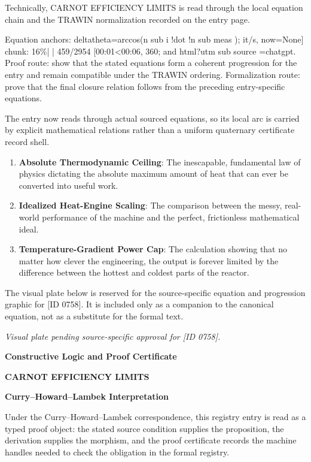 Technically, CARNOT EFFICIENCY LIMITS is read through the local equation chain and the TRAWIN normalization recorded on the entry page.

Equation anchors: deltatheta=arccos(n sub i !dot !n sub meas ); it/s, now=None] chunk: 16\%|   | 459/2954 [00:01<00:06, 360; and html?utm sub source =chatgpt. Proof route: show that the stated equations form a coherent progression for the entry and remain compatible under the TRAWIN ordering. Formalization route: prove that the final closure relation follows from the preceding entry-specific equations.

The entry now reads through actual sourced equations, so its local arc is carried by explicit mathematical relations rather than a uniform quaternary certificate record shell.
\endgroup

\begin{enumerate}[leftmargin=1.6em,itemsep=6pt,topsep=4pt]
\item \textbf{Absolute Thermodynamic Ceiling}: The inescapable, fundamental law of physics dictating the absolute maximum amount of heat that can ever be converted into useful work.
\item \textbf{Idealized Heat-Engine Scaling}: The comparison between the messy, real-world performance of the machine and the perfect, frictionless mathematical ideal.
\item \textbf{Temperature-Gradient Power Cap}: The calculation showing that no matter how clever the engineering, the output is forever limited by the difference between the hottest and coldest parts of the reactor.
\end{enumerate}

\begingroup\footnotesize\sloppy
The visual plate below is reserved for the source-specific equation and progression graphic for [ID 0758]. It is included only as a companion to the canonical equation, not as a substitute for the formal text.
\par\endgroup
\begingroup\footnotesize\itshape
Visual plate pending source-specific approval for [ID 0758].
\par\endgroup

\clearpage
\begingroup\tzpsupportsetup
\noindent\textbf{\fontsize{10.8pt}{12.8pt}\selectfont [ID 0758] Constructive Logic and Proof Certificate}\par
\noindent\textbf{\fontsize{10pt}{12pt}\selectfont CARNOT EFFICIENCY LIMITS}\par
\vspace{0.45em}
\begingroup
\footnotesize
\setlength{\parskip}{0.22em}
\setlength{\parindent}{0pt}
\noindent\textbf{Curry--Howard--Lambek Interpretation}\par
Under the Curry--Howard--Lambek correspondence, this registry entry is read as a typed proof
object: the stated source condition supplies the proposition, the derivation supplies the
morphism, and the proof certificate records the machine handles needed to check the obligation
in the formal registry.

